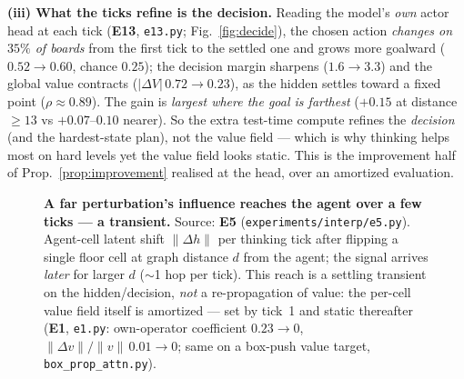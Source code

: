 \documentclass{article} %
\theoremstyle{plain}
\theoremstyle{definition}
\begin{document}
\textbf{(iii) What the ticks refine is the decision.} Reading the model's
\emph{own} actor head at each tick (\textbf{E13}, \texttt{e13.py};
Fig.~\ref{fig:decide}), the chosen action \emph{changes on $35\%$ of
boards} from the first tick to the settled one and grows more goalward
($0.52\to0.60$, chance $0.25$); the decision margin sharpens ($1.6\to3.3$) and the
global value contracts ($|\Delta V|\,0.72\to0.23$), as the hidden settles toward a
fixed point ($\rho{\approx}0.89$). The gain is \emph{largest where the goal is
farthest} (${+}0.15$ at distance $\geq13$ vs ${+}0.07$--$0.10$ nearer). So the
extra test-time compute refines the \emph{decision} (and the hardest-state plan),
not the value field --- which is why thinking helps most on hard levels yet the
value field looks static. This is the improvement half of
Prop.~\ref{prop:improvement} realised at the head, over an amortized evaluation.

\begin{figure}[t]\centering
{}
\caption{\textbf{A far perturbation's influence reaches the agent over a few ticks --- a
transient.} Source: \textbf{E5} (\texttt{experiments/interp/e5.py}). Agent-cell latent
shift $\lVert\Delta h\rVert$ per thinking tick after flipping a single floor cell at graph
distance $d$ from the agent; the signal arrives \emph{later} for larger $d$ ($\sim$1 hop per
tick). This reach is a settling transient on the hidden/decision, \emph{not} a re-propagation
of value: the per-cell value field itself is amortized --- set by tick~1 and static thereafter
(\textbf{E1}, \texttt{e1.py}: own-operator coefficient $0.23\!\to\!0$,
$\lVert\Delta v\rVert/\lVert v\rVert\,0.01\!\to\!0$; same on a box-push value target,
\texttt{box\_prop\_attn.py}).}
\label{fig:reach}
\end{figure}
\end{document}
